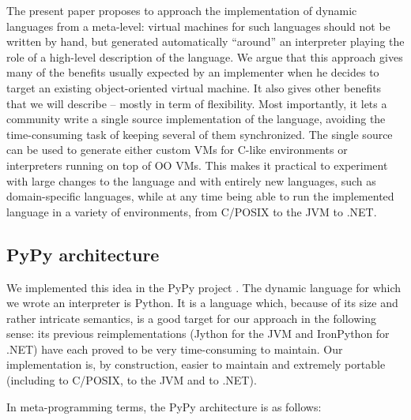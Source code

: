 \documentclass{llncs}
\begin{document}
The present paper proposes to approach the implementation of dynamic
languages from a meta-level: virtual machines for such languages should
not be written by hand, but generated automatically ``around'' an
interpreter playing the role of a high-level description of the language.  We
argue that this approach gives many of the benefits usually expected by
an implementer when he decides to target an existing object-oriented
virtual machine.  It also gives other benefits that we will describe --
mostly in term of flexibility.  Most importantly, it lets a
community write a single source implementation of the language, avoiding
the time-consuming task of keeping several of them synchronized.  The single
source can be used to generate either custom VMs for C-like
environments or interpreters running on top of OO VMs.  This makes it
practical to experiment with large changes to the language and with
entirely new languages, such as domain-specific languages, while at any
time being able to run the implemented language in a variety of
environments, from C/POSIX to the JVM to .NET.

\subsection{PyPy architecture}

We implemented this idea in the PyPy project \cite{pypy}.  The dynamic language
for which we wrote an interpreter is Python.  It is a language which,
because of its size and rather intricate semantics, is a good target for
our approach in the following sense: its previous reimplementations
(Jython for the JVM and IronPython for .NET) have each proved to be very
time-consuming to maintain.  Our implementation is, by construction,
easier to maintain and extremely portable (including to C/POSIX, to the
JVM and to .NET).

In meta-programming terms, the PyPy architecture is as follows:
\end{document}

